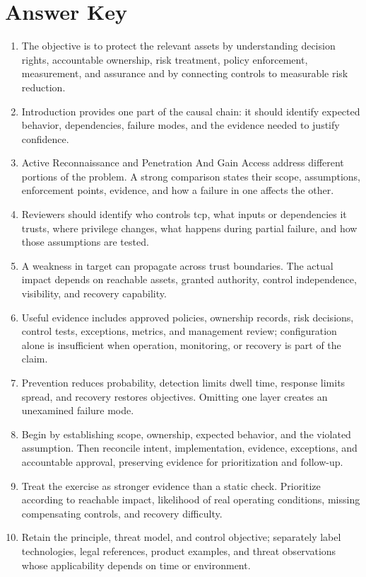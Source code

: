 \documentclass[11pt,letterpaper]{article}
\begin{document}
\section*{Answer Key}
\begin{enumerate}
\item The objective is to protect the relevant assets by understanding decision rights, accountable ownership, risk treatment, policy enforcement, measurement, and assurance and by connecting controls to measurable risk reduction.
\item Introduction provides one part of the causal chain: it should identify expected behavior, dependencies, failure modes, and the evidence needed to justify confidence.
\item Active Reconnaissance and Penetration And Gain Access address different portions of the problem. A strong comparison states their scope, assumptions, enforcement points, evidence, and how a failure in one affects the other.
\item Reviewers should identify who controls tcp, what inputs or dependencies it trusts, where privilege changes, what happens during partial failure, and how those assumptions are tested.
\item A weakness in target can propagate across trust boundaries. The actual impact depends on reachable assets, granted authority, control independence, visibility, and recovery capability.
\item Useful evidence includes approved policies, ownership records, risk decisions, control tests, exceptions, metrics, and management review; configuration alone is insufficient when operation, monitoring, or recovery is part of the claim.
\item Prevention reduces probability, detection limits dwell time, response limits spread, and recovery restores objectives. Omitting one layer creates an unexamined failure mode.
\item Begin by establishing scope, ownership, expected behavior, and the violated assumption. Then reconcile intent, implementation, evidence, exceptions, and accountable approval, preserving evidence for prioritization and follow-up.
\item Treat the exercise as stronger evidence than a static check. Prioritize according to reachable impact, likelihood of real operating conditions, missing compensating controls, and recovery difficulty.
\item Retain the principle, threat model, and control objective; separately label technologies, legal references, product examples, and threat observations whose applicability depends on time or environment.
\end{enumerate}
\end{document}
